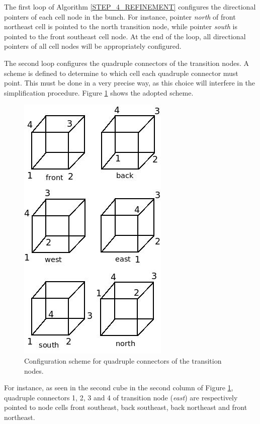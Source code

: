 The first loop of Algorithm \ref{STEP_4_REFINEMENT} configures the
directional pointers of each cell node in the bunch. For instance,
pointer \textit{north} of front northeast cell is pointed to the
north transition node, while pointer \textit{south} is pointed to
the front southeast cell node. At the end of the loop, all
directional pointers of all cell nodes will be appropriately
configured.

The second loop configures the quadruple connectors of the
transition nodes. A scheme is defined to determine to which cell
each quadruple connector must point. This must be done in a very
precise way, as this choice will interfere in the simplification
procedure. Figure \ref{SCHEME_4CONNECTORS} shows the adopted scheme.

\begin{figure}[!ht]
    \centering
    \includegraphics[scale=0.5]{../img/order_4connectors.jpg}
    \caption{Configuration scheme for quadruple connectors of the transition nodes.}
    \label{SCHEME_4CONNECTORS}
\end{figure}

For instance, as seen in the second cube in the second column of
Figure \ref{SCHEME_4CONNECTORS}, quadruple connectors 1, 2, 3 and 4
of transition node (\textit{east}) are respectively pointed to node
cells front southeast, back southeast, back northeast and front
northeast.


